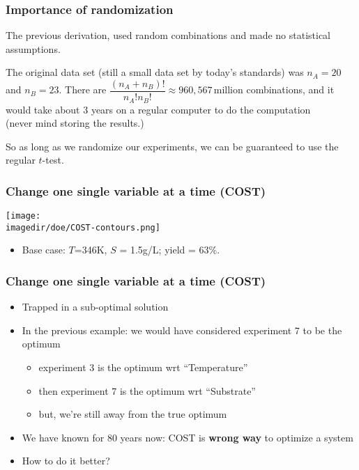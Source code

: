 \begin{frame}\frametitle{Importance of randomization}
	The previous derivation, used random combinations and made no statistical assumptions.
	
	\vspace{12pt}
	{}
	
	\vspace{12pt}
	The original data set (still a small data set by today's standards) was $n_A = 20$ and $n_B = 23$. There are $\dfrac{(n_A + n_B)!}{n_A! n_B!} \approx 960,567\,\text{million}$ combinations, and it would take about 3 years on a regular computer to do the computation\\ (never mind storing the results.)
	
	\vspace{12pt}
	So as long as we randomize our experiments, we can be guaranteed to use the regular $t$-test.
\end{frame}

\begin{frame}\frametitle{Change one single variable at a time (COST)}
	\begin{center}
		\texttt{[image: \\imagedir/doe/COST-contours.png]}
	\end{center}
	\begin{itemize}
		\item	Base case: $T$=346K, $S$ = 1.5g/L; yield = 63\%.
	\end{itemize}
\end{frame}

\begin{frame}\frametitle{Change one single variable at a time (COST)}
	\begin{itemize}
		\item	Trapped in a sub-optimal solution
		\item	In the previous example: we would have considered experiment 7 to be the optimum
			\begin{itemize}
				\item	experiment 3 is the optimum wrt ``Temperature''
				\item	then experiment 7 is the optimum wrt ``Substrate''
				\item	but, we're still away from the true optimum
			\end{itemize}
		\item	We have known for 80 years now: COST is \textbf{wrong way} to optimize a system
		\item	How to do it better?
	\end{itemize}
\end{frame}

